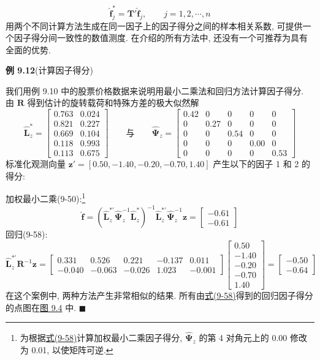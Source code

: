 
\[
\hat{\mathbf{f}}_j^*=\mathbf{T}'\hat{\mathbf{f}}_j,\qquad j=1,2,\cdots,n
\]
用两个不同计算方法生成在同一因子上的因子得分之间的样本相关系数, 可提供一个因子得分间一致性的数值测度. 在介绍的所有方法中, 还没有一个可推荐为具有全面的优势.

\noindent\textbf{例 9.12}\quad (计算因子得分)

我们用例 9.10 中的股票价格数据来说明用最小二乘法和回归方法计算因子得分. 由 $\mathbf{R}$ 得到估计的旋转载荷和特殊方差的极大似然解
\[
\hat{\mathbf{L}}_z^*=
\begin{bmatrix}
0.763&0.024\\
0.821&0.227\\
0.669&0.104\\
0.118&0.993\\
0.113&0.675
\end{bmatrix}
\qquad\text{与}\qquad
\hat{\boldsymbol{\Psi}}_z=
\begin{bmatrix}
0.42&0&0&0&0\\
0&0.27&0&0&0\\
0&0&0.54&0&0\\
0&0&0&0.00&0\\
0&0&0&0&0.53
\end{bmatrix}
\]
标准化观测向量 $\mathbf{z}'=[0.50,-1.40,-0.20,-0.70,1.40]$ 产生以下的因子 1 和 2 的得分:

加权最小二乘(9-50):\footnote{{\footnotesize 为根据\hyperref[eq:9-58]{式(9-58)}计算加权最小二乘因子得分, $\hat{\boldsymbol{\Psi}}_z$ 的第 4 对角元上的 0.00 修改为 0.01, 以使矩阵可逆.}}
\[
\hat{\mathbf{f}}=(\hat{\mathbf{L}}_z^{*'}\hat{\boldsymbol{\Psi}}_z^{-1}\hat{\mathbf{L}}_z^*)^{-1}\hat{\mathbf{L}}_z^{*'}\hat{\boldsymbol{\Psi}}_z^{-1}\mathbf{z}=
\begin{bmatrix}
-0.61\\
-0.61
\end{bmatrix}
\]
回归(9-58):
\[
\hat{\mathbf{L}}_z^{*'}\mathbf{R}^{-1}\mathbf{z}=
\begin{bmatrix}
0.331&0.526&0.221&-0.137&0.011\\
-0.040&-0.063&-0.026&1.023&-0.001
\end{bmatrix}
\begin{bmatrix}
0.50\\
-1.40\\
-0.20\\
-0.70\\
1.40
\end{bmatrix}
=
\begin{bmatrix}
-0.50\\
-0.64
\end{bmatrix}
\]
在这个案例中, 两种方法产生非常相似的结果. 所有由\hyperref[eq:9-58]{式(9-58)}得到的回归因子得分的点图在\hyperref[fig:9.4]{图 9.4} 中. \hfill$\blacksquare$

\begin{mvfigure}
\label{fig:9.4}
\end{mvfigure}
